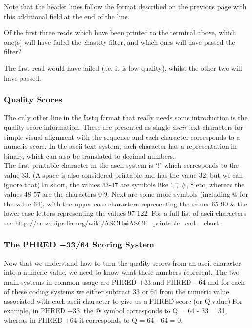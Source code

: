 Note that the header lines follow the format described on the previous page with this additional field at the end of the line.
\begin{questions}
Of the first three reads which have been printed to the terminal above, which one(s) will have failed the chastity filter, and which ones will have passed the filter?\\
\begin{answer}
The first read would have failed (i.e. it is low quality), whilst the other two will have passed.
\end{answer}
\end{questions}

\subsubsection{Quality Scores}
\begin{information}
The only other line in the fastq format that really needs some introduction is the quality score information.
These are presented as single \textit{ascii} text characters for simple visual alignment with the sequence and each character corresponds to a numeric score.
In the ascii text system, each character has a representation in binary, which can also be translated to decimal numbers.\\

The first printable character in the ascii system is `!' which corresponds to the value 33. 
(A space is also considered printable and has the value 32, but we can ignore that)
In short, the values 33-47 are symbols like !, \", \#, \$ etc, whereas the values 48-57 are the characters 0-9.
Next are some more symbols (including @ for the value 64), with the upper case characters representing the values 65-90 \& the lower case letters representing the values 97-122.
For a full list of ascii characters see \url{http://en.wikipedia.org/wiki/ASCII#ASCII_printable_code_chart}.
\end{information}

\subsubsection{The PHRED +33/64 Scoring System}
\begin{information}
Now that we understand how to turn the quality scores from an ascii character into a numeric value, we need to know what these numbers represent.
The two main systems in common usage are PHRED +33 and PHRED +64 and for each of these coding systems we either subtract 33 or 64 from the numeric value associated with each ascii character to give us a PHRED score (or Q-value)
For example, in PHRED +33, the @ symbol corresponds to Q = 64 - 33 = 31, whereas in PHRED +64 it corresponds to Q = 64 - 64 = 0. \\
\end{information}

